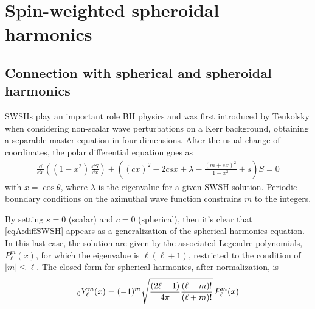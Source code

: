 
\label{AppendixA} %
\chapter{Spin-weighted spheroidal harmonics} %


\section{Connection with spherical and spheroidal harmonics}

SWSHs play an important role BH physics and was first introduced by Teukolsky when considering non-scalar wave perturbations on a Kerr background, obtaining a separable master equation in four dimensions. After the usual change of coordinates, the polar differential equation goes as 
\begin{align}
	\frac{\dd}{\dd x} \left( (1-x^2) \, \frac{\dd S}{\dd x} \right) + \left( (c x)^2 - 2 c s x + \lambda -\frac{(m + s x)^2}{1-x^2} + s \right) S = 0 
	\label{eqA:diffSWSH}
\end{align}
with $x=\cos\theta$, where $\lambda$ is the eigenvalue for a given SWSH solution. Periodic boundary conditions on the azimuthal wave function constrains $m$ to the integers.   

By setting $s=0$ (scalar) and $c=0$ (spherical), then it's clear that \eqref{eqA:diffSWSH} appears as a generalization of the spherical harmonics equation. In this last case, the solution are given by the associated Legendre polynomials, $P^m_\ell (x)$, for which the eigenvalue is $\ell(\ell+1)$, restricted to the condition of $|m| \le \ell$. The closed form for spherical harmonics, after normalization, is
\begin{align}
{}_{0}Y_{\ell}^{m}(x)=(-1)^{m}{\sqrt {{(2\ell +1) \over 4\pi }{(\ell -m)! \over (\ell +m)!}}}\,P_{\ell }^{m}(x)
\label{eqA:SH}
\end{align}